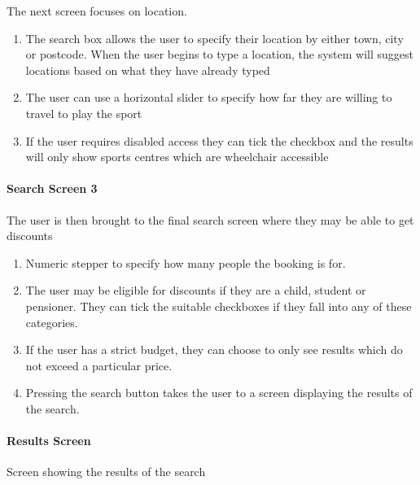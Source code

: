 The next screen focuses on location.

\begin{enumerate}
	\item The search box allows the user to specify their location by either
		town, city or postcode. When the user begins to type a location, the
		system will suggest locations based on what they have already typed
	\item The user can use a horizontal slider to specify how far they are
		willing to travel to play the sport
	\item If the user requires disabled access they can tick the checkbox and
		the results will only show sports centres which are wheelchair
		accessible
\end{enumerate}

\paragraph{Search Screen 3}
The user is then brought to the final search screen where they may be able to
get discounts

\begin{enumerate}
	\item Numeric stepper to specify how many people the booking is for.
	\item The user may be eligible for discounts if they are a child, student
		or pensioner. They can tick the suitable checkboxes if they fall into
		any of these categories.
	\item If the user has a strict budget, they can choose to only see results
		which do not exceed a  particular price.
	\item Pressing the search button takes the user to a screen displaying the
		results of the search.
\end{enumerate}

\paragraph{Results Screen}
Screen showing the results of the search


